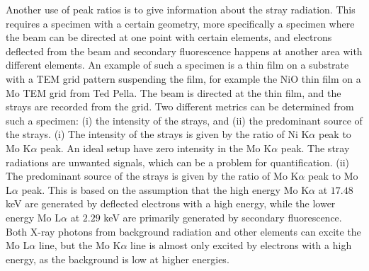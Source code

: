 Another use of peak ratios is to give information about the stray radiation.
This requires a specimen with a certain geometry, more specifically a specimen where the beam can be directed at one point with certain elements, and electrons deflected from the beam and secondary fluorescence happens at another area with different elements.
An example of such a specimen is a thin film on a substrate with a TEM grid pattern suspending the film, for example the NiO thin film on a Mo TEM grid from Ted Pella.
The beam is directed at the thin film, and the strays are recorded from the grid.
Two different metrics can be determined from such a specimen: (i) the intensity of the strays, and (ii) the predominant source of the strays.
(i) The intensity of the strays is given by the ratio of Ni K$\alpha$ peak to Mo K$\alpha$ peak.
An ideal setup have zero intensity in the Mo K$\alpha$ peak.
The stray radiations are unwanted signals, which can be a problem for quantification.
(ii) The predominant source of the strays is given by the ratio of Mo K$\alpha$ peak to Mo L$\alpha$ peak.
This is based on the assumption that the high energy Mo K$\alpha$ at $17.48$ keV are generated by deflected electrons with a high energy, while the lower energy Mo L$\alpha$ at $2.29$ keV are primarily generated by secondary fluorescence.
Both X-ray photons from background radiation and other elements can excite the Mo L$\alpha$ line, but the Mo K$\alpha$ line is almost only excited by electrons with a high energy, as the background is low at higher energies.







